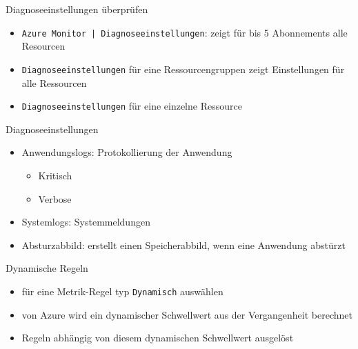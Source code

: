 

\begin{flashcard}[Definition]{Diagnoseeinstellungen überprüfen}
    \begin{itemize}
        \item \texttt{Azure Monitor | Diagnoseeinstellungen}: zeigt für bis 5 Abonnements alle Resourcen
        \item \texttt{Diagnoseeinstellungen} für eine Ressourcengruppen zeigt Einstellungen für alle Ressourcen
         \item \texttt{Diagnoseeinstellungen} für eine einzelne Ressource
    \end{itemize}
\end{flashcard}

\begin{flashcard}[Definition]{Diagnoseeinstellungen}
    \begin{itemize}
        \item Anwendungslogs: Protokollierung der Anwendung
            \begin{itemize}
                \item Kritisch
                \item Verbose
            \end{itemize}
        \item Systemlogs: Systemmeldungen
        \item Absturzabbild: erstellt einen Speicherabbild, wenn eine Anwendung abstürzt
    \end{itemize}
\end{flashcard}


\begin{flashcard}[Definition]{Dynamische Regeln}
    \begin{itemize}
        \item für eine Metrik-Regel typ \texttt{Dynamisch} auswählen
        \item von Azure wird ein dynamischer Schwellwert aus der Vergangenheit berechnet
        \item Regeln abhängig von diesem dynamischen Schwellwert ausgelöst
    \end{itemize}
\end{flashcard}

